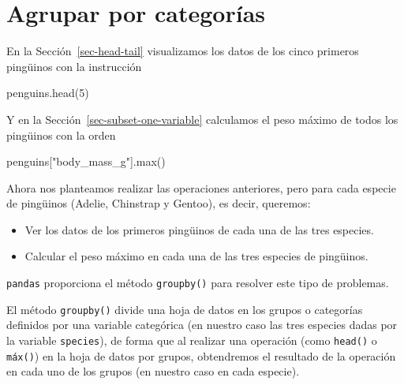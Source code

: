 \documentclass[
  a4paper,
  noprof,
  12pt,
  notoc,
  nosols,
  nobib]{mnye}
\newenvironment{Shaded}{\begin{snugshade}}{\end{snugshade}}
\newcommand{\BuiltInTok}[1]{\textcolor[rgb]{0.00,0.23,0.31}{#1}}
\newcommand{\DecValTok}[1]{\textcolor[rgb]{0.68,0.00,0.00}{#1}}
\newcommand{\NormalTok}[1]{\textcolor[rgb]{0.00,0.23,0.31}{#1}}
\newcommand{\StringTok}[1]{\textcolor[rgb]{0.13,0.47,0.30}{#1}}
\providecommand{\tightlist}{%
  \setlength{\itemsep}{0pt}\setlength{\parskip}{0pt}}\usepackage{longtable,booktabs,array}
\theoremstyle{definition}
\theoremstyle{remark}
\begin{document}

\section{Agrupar por categorías}\label{sec-groupby}

En la Sección~\ref{sec-head-tail} visualizamos los datos de los cinco
primeros pingüinos con la instrucción

\begin{Shaded}
\begin{Highlighting}[]
\NormalTok{penguins.head(}\DecValTok{5}\NormalTok{)}
\end{Highlighting}
\end{Shaded}

Y en la Sección~\ref{sec-subset-one-variable} calculamos el peso máximo
de todos los pingüinos con la orden

\begin{Shaded}
\begin{Highlighting}[]
\NormalTok{penguins[}\StringTok{"body\_mass\_g"}\NormalTok{].}\BuiltInTok{max}\NormalTok{()}
\end{Highlighting}
\end{Shaded}

Ahora nos planteamos realizar las operaciones anteriores, pero para cada
especie de pingüinos (Adelie, Chinstrap y Gentoo), es decir, queremos:

\begin{itemize}
\tightlist
\item
  Ver los datos de los primeros pingüinos de cada una de las tres
  especies.
\item
  Calcular el peso máximo en cada una de las tres especies de pingüinos.
\end{itemize}

\texttt{pandas} proporciona el método \texttt{groupby()} para resolver
este tipo de problemas.

El método \texttt{groupby()} divide una hoja de datos en los grupos o
categorías definidos por una variable categórica (en nuestro caso las
tres especies dadas por la variable \texttt{species}), de forma que al
realizar una operación (como \texttt{head()} o \texttt{máx()}) en la
hoja de datos por grupos, obtendremos el resultado de la operación en
cada uno de los grupos (en nuestro caso en cada especie).
\end{document}
